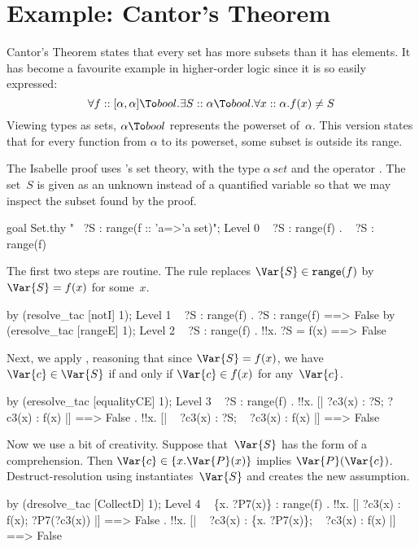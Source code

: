 \goodbreak
\section{Example: Cantor's Theorem}\label{sec:hol-cantor}
Cantor's Theorem states that every set has more subsets than it has
elements.  It has become a favourite example in higher-order logic since
it is so easily expressed:
\[  \forall f::[\alpha,\alpha]\To bool. \exists S::\alpha\To bool.
    \forall x::\alpha. f(x) \not= S 
\] 
%
Viewing types as sets, $\alpha\To bool$ represents the powerset
of~$\alpha$.  This version states that for every function from $\alpha$ to
its powerset, some subset is outside its range.  

The Isabelle proof uses \HOL's set theory, with the type $\alpha\,set$ and
the operator .  The set~$S$ is given as an unknown instead of a
quantified variable so that we may inspect the subset found by the proof.
\begin{ttbox}
goal Set.thy "~ ?S : range(f :: 'a=>'a set)";
{\out Level 0}
{\out ~ ?S : range(f)}
{. ~ ?S : range(f)}
\end{ttbox}
The first two steps are routine.  The rule  replaces
$\Var{S}\in {\tt range}(f)$ by $\Var{S}=f(x)$ for some~$x$.
\begin{ttbox}
by (resolve_tac [notI] 1);
{\out Level 1}
{\out ~ ?S : range(f)}
{. ?S : range(f) ==> False}
\ttbreak
by (eresolve_tac [rangeE] 1);
{\out Level 2}
{\out ~ ?S : range(f)}
{. !!x. ?S = f(x) ==> False}
\end{ttbox}
Next, we apply , reasoning that since $\Var{S}=f(x)$,
we have $\Var{c}\in \Var{S}$ if and only if $\Var{c}\in f(x)$ for
any~$\Var{c}$.
\begin{ttbox}
by (eresolve_tac [equalityCE] 1);
{\out Level 3}
{\out ~ ?S : range(f)}
{. !!x. [| ?c3(x) : ?S; ?c3(x) : f(x) |] ==> False}
{. !!x. [| ~ ?c3(x) : ?S; ~ ?c3(x) : f(x) |] ==> False}
\end{ttbox}
Now we use a bit of creativity.  Suppose that~$\Var{S}$ has the form of a
comprehension.  Then $\Var{c}\in\{x.\Var{P}(x)\}$ implies
$\Var{P}(\Var{c})$.   Destruct-resolution using 
instantiates~$\Var{S}$ and creates the new assumption.
\begin{ttbox}
by (dresolve_tac [CollectD] 1);
{\out Level 4}
{\out ~ \{x. ?P7(x)\} : range(f)}
{. !!x. [| ?c3(x) : f(x); ?P7(?c3(x)) |] ==> False}
{. !!x. [| ~ ?c3(x) : \{x. ?P7(x)\}; ~ ?c3(x) : f(x) |] ==> False}
\end{ttbox}
